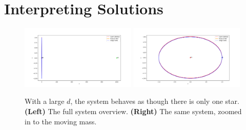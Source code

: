 \documentclass[preprint,titlepage,preprintnumbers,amsmath,amssymb,aps,11pt]{revtex4-2}
\begin{document}
\section{Interpreting Solutions}\label{sec:description}
\begin{figure}
    \centering
    \includegraphics[width=0.49\textwidth]{Far M2.png}
    \includegraphics[width=0.49\textwidth]{Far M2 Zoomed.png}
    \caption{With a large $d$, the system behaves as though there is only one star. {\bf(Left)} The full system overview. {\bf(Right)} The same system, zoomed in to the moving mass.}
    \label{fig:farstar}
\end{figure}
\end{document}
